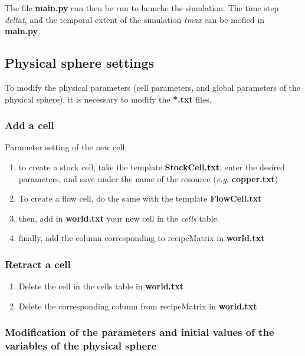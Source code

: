 \documentclass[12pt,a4paper]{article}%
\begin{document}
The file \textbf{main.py} can then be run to launche the simulation. The time step \textit{deltat}, and the temporal extent of the simulation \textit{tmax} can be mofied in \textbf{main.py}.

\subsection{Physical sphere settings}

To modify the physical parameters (cell parameters, and global parameters of the physical sphere), it is necessary to modify the \textbf{*.txt} files.

\subsubsection{Add a cell}

Parameter setting of the new cell:
\begin{enumerate}
	\item to create a stock cell, take the template \textbf{StockCell.txt}, enter the desired parameters, and save under the name of the resource (\textit{e.g.} \textbf{copper.txt})
	
	\item To create a flow cell, do the same with the template \textbf{FlowCell.txt}
	
	\item then, add in \textbf{world.txt} your new cell in the \textit{cells} table.
	
	\item finally, add the column corresponding to recipeMatrix in \textbf{world.txt}
\end{enumerate}

\subsubsection{Retract a cell}

\begin{enumerate}
	\item Delete the cell in the cells table in \textbf{world.txt}
	
	\item Delete the corresponding column from recipeMatrix in \textbf{world.txt}
\end{enumerate}

\subsubsection{Modification of the parameters and initial values of the variables of the physical sphere}
\end{document}
